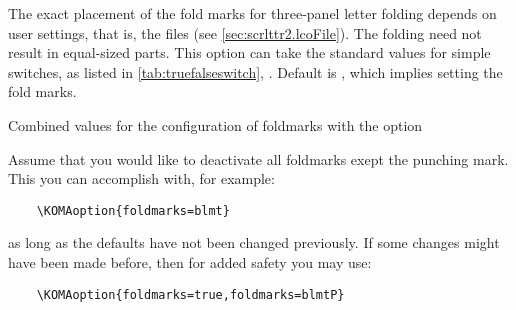 The exact placement of the fold marks for three-panel letter folding
depends on user settings, that is, the  files (see
\autoref{sec:scrlttr2.lcoFile}). The folding need not result in
equal-sized parts. This option can take the standard values for simple
switches, as listed in \autoref{tab:truefalseswitch},
. Default is
, which implies setting the fold marks.
\begin{table}
  \centering
  \caption{Combined values for the configuration of foldmarks with the
    option }
  \label{tab:scrlttr2.foldmark}
  \begin{desctabular}
  \end{desctabular}
\end{table}
\begin{Example}
  Assume that you would like to deactivate all foldmarks exept the punching
  mark.  This you can accomplish with, for example:
  \begin{lstlisting}
    \KOMAoption{foldmarks=blmt}
  \end{lstlisting}
  as long as the defaults have not been changed previously. If some changes
  might have been made before, then for added safety you may use:
  \begin{lstlisting}
    \KOMAoption{foldmarks=true,foldmarks=blmtP}
  \end{lstlisting}
\end{Example}%
%

